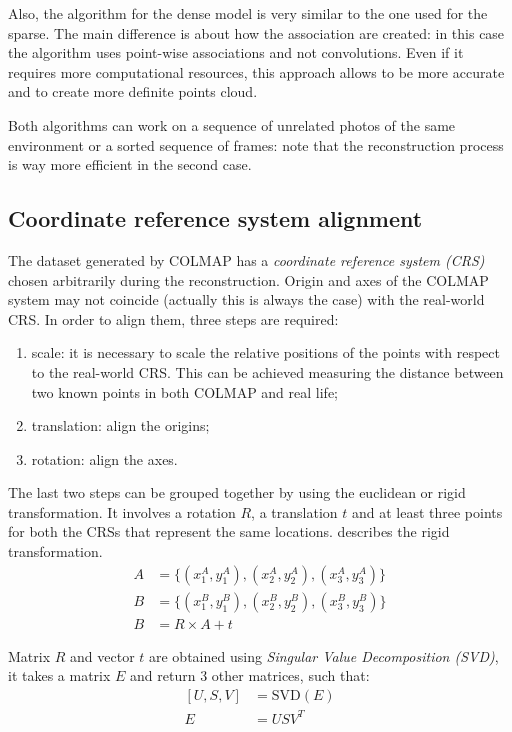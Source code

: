 Also, the algorithm for the dense model is very similar to the one used for the sparse. The main difference is about how the association are created: in this case the algorithm uses point-wise associations and not convolutions. Even if it requires more computational resources, this approach allows to be more accurate and to create more definite points cloud.

Both algorithms can work on a sequence of unrelated photos of the same environment or a sorted sequence of frames: note that the reconstruction process is way more efficient in the second case.

\subsection{Coordinate reference system alignment}
The dataset generated by COLMAP has a \emph{coordinate reference system (CRS)} chosen arbitrarily during the reconstruction. Origin and axes of the COLMAP system may not coincide (actually this is always the case) with the real-world CRS. In order to align them, three steps are required:
\begin{enumerate}
    \item scale: it is necessary to scale the relative positions of the points with respect to the real-world CRS. This can be achieved measuring the distance between two known points in both COLMAP and real life;
    \item translation: align the origins;
    \item rotation: align the axes.
\end{enumerate}
The last two steps can be grouped together by using the euclidean or rigid transformation.
It involves a rotation $R$, a translation $t$ and at least three points for both the CRSs that represent the same locations.  describes the rigid transformation.
\begin{equation}
    \begin{aligned}
        A & =\{(x_1^A, y_1^A), (x_2^A, y_2^A), (x_3^A, y_3^A)\} \\
        B & =\{(x_1^B, y_1^B), (x_2^B, y_2^B), (x_3^B, y_3^B)\} \\
        B & = R \times A+t
    \end{aligned}
    \label{eq:rigid-tranform}
\end{equation}

Matrix $R$ and vector $t$ are obtained using \textit{Singular Value Decomposition (SVD)}, it takes a matrix $E$ and return 3 other matrices, such that:
\begin{equation}
    \begin{aligned}
        [U, S, V] & = \textrm{SVD}(E) \\
        E         & = USV^T
    \end{aligned}
    \label{eq:singular-value-decomposition}
\end{equation}

